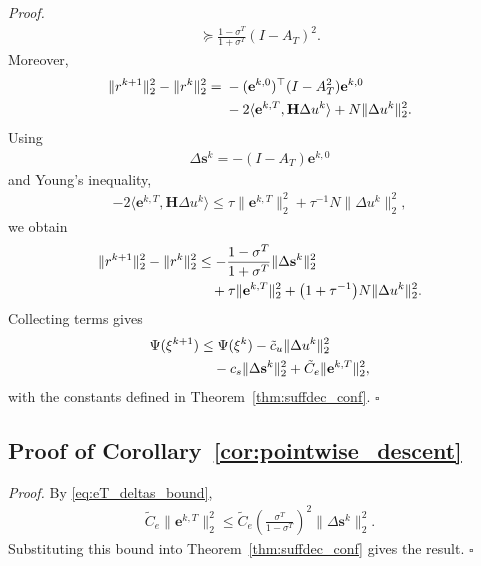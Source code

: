 \documentclass[letterpaper, 10 pt, conference]{ieeeconf} %
\newenvironment{proof}[1][Proof]{\par\noindent\textit{#1. }\ignorespaces}
  {\hfill$\square$\par}
\begin{document}
\begin{proof}
\begin{align}
\succeq
\frac{1-\sigma^T}{1+\sigma^T}(I-A_T)^2 .
\end{align}
Moreover,
\begin{align}
\|r^{k+1}\|_2^2-\|r^k\|_2^2
={}&
-(\mathbf e^{k,0})^\top
(I-A_T^2)\mathbf e^{k,0}
\notag\\
&-2\langle\mathbf e^{k,T},
\mathbf H\Delta u^k\rangle
+N\|\Delta u^k\|_2^2 .
\end{align}
Using
\begin{align}
\Delta\mathbf s^k
=-(I-A_T)\mathbf e^{k,0}
\end{align}
and Young's inequality,
\begin{align}
-2\langle\mathbf e^{k,T},\mathbf H\Delta u^k\rangle
\le
\tau\|\mathbf e^{k,T}\|_2^2
+\tau^{-1}N\|\Delta u^k\|_2^2,
\end{align}
we obtain
\begin{align}
\|r^{k+1}\|_2^2-\|r^k\|_2^2
&\le -\frac{1-\sigma^T}{1+\sigma^T}
\|\Delta\mathbf s^k\|_2^2 \notag\\
&\quad +\tau\|\mathbf e^{k,T}\|_2^2
+\bigl(1+\tau^{-1}\bigr)N\|\Delta u^k\|_2^2 .
\end{align}
Collecting terms gives
\begin{align}
\Psi(\xi^{k+1})
&\le \Psi(\xi^k)
-\tilde c_u\|\Delta u^k\|_2^2 \notag\\
&\quad -c_s\|\Delta\mathbf s^k\|_2^2
+\tilde C_e\|\mathbf e^{k,T}\|_2^2,
\end{align}
with the constants defined in Theorem~\ref{thm:suffdec_conf}.
\end{proof}

\subsection{Proof of Corollary~\ref{cor:pointwise_descent}}
\begin{proof}
By \eqref{eq:eT_deltas_bound},
\begin{align}
\tilde C_e\|\mathbf e^{k,T}\|_2^2
\le
\tilde C_e
\left(\frac{\sigma^T}{1-\sigma^T}\right)^2
\|\Delta\mathbf s^k\|_2^2.
\end{align}
Substituting this bound into Theorem~\ref{thm:suffdec_conf} gives the result.
\end{proof}
\end{document}

